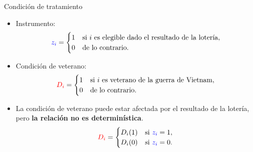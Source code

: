 \documentclass[10pt, xcolor=dvipsnames]{beamer}
\begin{document}
\begin{frame}{Condición de tratamiento}
	\begin{itemize}
		\item Instrumento:
    \begin{align*}
    \textcolor{blue}{z_i} = 
        \begin{cases}
        1 &\hspace{0.5pt} \text{si $i$ es elegible dado el resultado de la lotería},\\
        0 &\hspace{0.5pt} \text{de lo contrario}.
        \end{cases}
    \end{align*}		
		\item Condición de veterano: 
\begin{align*}
    \textcolor{red}{D_i} = 
    \begin{cases}
    1 &\hspace{0.5pt} \text{si $i$ es veterano de la guerra de Vietnam},\\
    0 &\hspace{0.5pt} \text{de lo contrario}.
    \end{cases}
\end{align*}		
		\item La condición de veterano puede estar afectada por el resultado de la lotería, pero \textbf{la relación no es determinística}. 
\begin{align*}
    \textcolor{red}{D_i} = 
    \begin{cases}
    D_i(1) &\hspace{0.5pt} \text{si $\textcolor{blue}{z_i}=1$},\\
    D_i(0) &\hspace{0.5pt} \text{si $\textcolor{blue}{z_i}=0$}.
    \end{cases}
\end{align*}		
	\end{itemize}
\end{frame}
\end{document}
